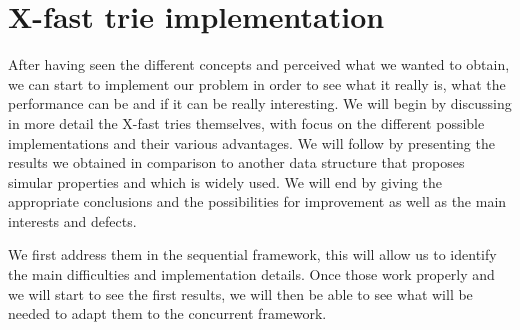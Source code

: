 
\chapter{X-fast trie implementation}\label{XFASTTRIEIMPLEMENTATION}

After having seen the different concepts and perceived what we wanted to obtain, we can start to implement our problem in order to see what it really is, what the performance can be and if it can be really interesting. We will begin by discussing in more detail the X-fast tries themselves, with focus on the different possible implementations and their various advantages. We will follow by presenting the results we obtained in comparison to another data structure that proposes simular properties and which is widely used. We will end by giving the appropriate conclusions and the possibilities for improvement as well as the main interests and defects.

We first address them in the sequential framework, this will allow us to identify the main difficulties and implementation details. Once those work properly and we will start to see the first results, we will then be able to see what will be needed to adapt them to the concurrent framework.

